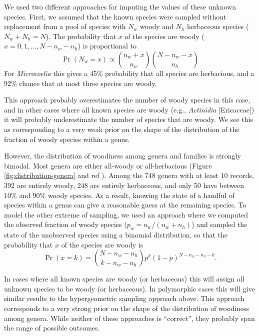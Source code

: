 \documentclass[12pt]{article}
\begin{document}
We used two different approaches for imputing the values of these
unknown species. First, we assumed that the known species were
sampled without replacement from a pool of species with $N_w$ woody
and $N_h$ herbaceous species ($N_w + N_h = N$). The probability that
$x$ of the species are woody ($x = 0, 1, \ldots, N - n_w - n_h$) is
proportional to
\begin{equation}
  \Pr(N_w = x) \propto {n_w + x \choose n_w}
  {N - n_w - x \choose n_h}
\end{equation}
For \textit{Microcoelia} this gives a 45\% probability that all
species are herbacious, and a 92\% chance that at most three species
are woody.

This approach probably overestimates the number of woody species in
this case, and in other cases where all known species are woody (e.g.,
\textit{Actinidia} [Ericaceae]) it will probably underestimate the
number of species that are woody. We see this as corresponding to a
very weak prior on the shape of the distribution of the fraction of
woody species within a genus.

However, the distribution of woodiness among genera and families is
strongly bimodal. Most genera are either all-woody or all-herbacious
(Figure \ref{fig:distribution-genera} and ref
\citep{sinnott1915evolution}).  Among the 748 genera with at least 10
records, 392 are entirely woody, 248 are entirely herbaceous, and only
50 have between 10\% and 90\% woody species. As a result, knowing the
state of a handful of species within a genus can give a reasonable
guess at the remaining species.
To model the other extreme of sampling, we used an approach where we
computed the observed fraction of woody species ($p_w = n_w / (n_w +
n_h)$) and sampled the state of the unobserved species using a
binomial distribution, so that the probability that $x$ of the species
are woody is
\begin{equation}
  \Pr(x = k) = {N - n_w - n_h \choose k - n_w - n_h} 
  p^k (1-p)^{N - n_w - n_h - k}.
\end{equation}

In cases where all known species are woody (or herbaceous) this will
assign all unknown species to be woody (or herbaceous). In polymorphic
cases this will give similar results to the hypergeometric sampling
approach above. This approach corresponds to a very strong prior on
the shape of the distribution of woodiness among genera.
While neither of these approaches is ``correct'', they probably
span the range of possible outcomes.
\end{document}
